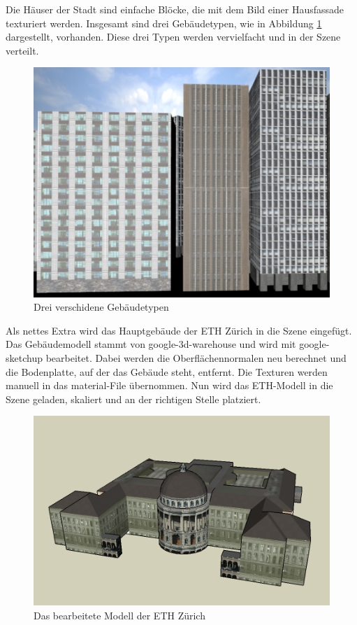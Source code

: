 Die Häuser der Stadt sind einfache Blöcke, die mit dem Bild einer Hausfassade texturiert werden. Insgesamt sind drei Gebäudetypen, wie in Abbildung \ref{screenshot_buildings} dargestellt,  vorhanden. Diese drei Typen werden vervielfacht und in der Szene verteilt.\\
\begin{figure}[H]
\centering 
\includegraphics[scale=0.4]{src/screenshot_buildings.png}
\caption{Drei verschidene Gebäudetypen} %
\label{screenshot_buildings} %
\end{figure}
Als nettes Extra wird das Hauptgebäude der ETH Zürich in die Szene eingefügt. Das Gebäudemodell stammt von \gls{google-3d-warehouse} und wird mit \gls{google-sketchup} bearbeitet. Dabei werden die Oberflächennormalen neu berechnet und die Bodenplatte, auf der das Gebäude steht, entfernt. Die Texturen werden manuell in das material-File übernommen. Nun wird das ETH-Modell in die Szene geladen, skaliert und an der richtigen Stelle platziert. 

\begin{figure}[H]
\centering 
\includegraphics[width=1\linewidth]{src/screenshot_googlesketchup.png}
\caption{Das bearbeitete Modell der ETH Zürich} %
\label{googlesketchup_eth} %
\end{figure}

